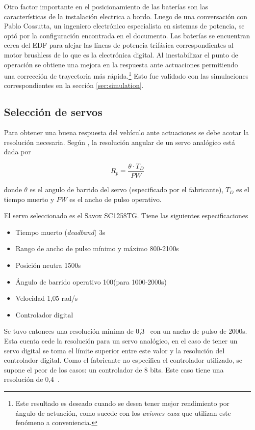 Otro factor importante en el posicionamiento de las baterías son las características
de la instalación electrica a bordo. Luego de una conversación con Pablo Cossutta, un ingeniero electrónico especialista en sistemas de potencia, se optó por la configuración encontrada en el documento. Las baterías se encuentran cerca del EDF para alejar las líneas de potencia trifásica correspondientes al motor brushless de lo que es la electrónica digital. Al inestabilizar el punto de operación se obtiene una mejora en la respuesta ante actuaciones permitiendo una corrección de trayectoria más rápida.\footnote{Este resultado es deseado cuando se desea tener mejor rendimiento por ángulo de actuación, como sucede con los \textit{aviones caza} que utilizan este fenómeno a conveniencia.} Esto fue validado con las simulaciones correspondientes en la sección \ref{sec:simulation}.





\subsection{Selección de servos} \label{ssec:servoSeleccion}

Para obtener una buena respuesta del vehículo ante actuaciones se debe acotar la resolución necesaria. Según \cite{castillo2018efectos}, la resolución angular de un servo analógico está dada por


\[
R_p = \frac{\theta \cdot T_D}{PW}  
\]

donde $\theta$ es el angulo de barrido del servo (especificado por el fabricante), $T_D$ es el tiempo muerto y $PW$ es el ancho de pulso operativo. 

El servo seleccionado es el Savox SC1258TG. Tiene las siguientes especificaciones

\begin{itemize}
    \item Tiempo muerto (\textit{deadband}) 3\micro s
    \item Rango de ancho de pulso mínimo y máximo 800-2100\micro s
    \item Posición neutra 1500\micro s
    \item Ángulo de barrido operativo 100\grad (para 1000-2000\micro s)
    \item Velocidad 1,05 rad/s
    \item Controlador digital
\end{itemize}

Se tuvo entonces una resolución mínima de 0,3\grad~ con un ancho de pulso de 2000\micro s. Esta cuenta cede la resolución para un servo analógico, en el caso de tener un servo digital se toma el límite superior entre este valor y la resolución del controlador digital. Como el fabricante no especifica el controlador utilizado, se supone el peor de los casos: un controlador de 8 bits. Este caso tiene una resolución de 0,4\grad~.

